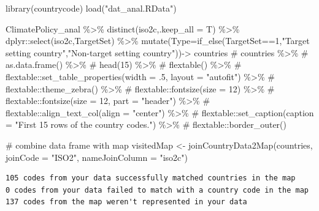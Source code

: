 \documentclass[
  letterpaper,
  DIV=11,
  numbers=noendperiod]{scrartcl}
\newenvironment{Shaded}{\begin{snugshade}}{\end{snugshade}}
\newcommand{\AttributeTok}[1]{\textcolor[rgb]{0.40,0.46,0.14}{#1}}
\newcommand{\CommentTok}[1]{\textcolor[rgb]{0.37,0.37,0.37}{#1}}
\newcommand{\DecValTok}[1]{\textcolor[rgb]{0.68,0.00,0.00}{#1}}
\newcommand{\FunctionTok}[1]{\textcolor[rgb]{0.28,0.35,0.67}{#1}}
\newcommand{\NormalTok}[1]{\textcolor[rgb]{0.00,0.46,0.62}{#1}}
\newcommand{\OtherTok}[1]{\textcolor[rgb]{0.00,0.46,0.62}{#1}}
\newcommand{\SpecialCharTok}[1]{\textcolor[rgb]{0.37,0.37,0.37}{#1}}
\newcommand{\StringTok}[1]{\textcolor[rgb]{0.13,0.47,0.30}{#1}}
\begin{document}
\begin{Shaded}
\begin{Highlighting}[]
\FunctionTok{library}\NormalTok{(countrycode)}
\FunctionTok{load}\NormalTok{(}\StringTok{"dat\_anal.RData"}\NormalTok{)}

\NormalTok{ClimatePolicy\_anal }\SpecialCharTok{\%\textgreater{}\%} 
  \FunctionTok{distinct}\NormalTok{(iso2c,}\AttributeTok{.keep\_all =}\NormalTok{ T) }\SpecialCharTok{\%\textgreater{}\%}
\NormalTok{  dplyr}\SpecialCharTok{::}\FunctionTok{select}\NormalTok{(iso2c,TargetSet) }\SpecialCharTok{\%\textgreater{}\%}
  \FunctionTok{mutate}\NormalTok{(}\AttributeTok{Type=}\FunctionTok{if\_else}\NormalTok{(TargetSet}\SpecialCharTok{==}\DecValTok{1}\NormalTok{,}\StringTok{"Target setting country"}\NormalTok{,}\StringTok{"Non{-}target setting country"}\NormalTok{))}\OtherTok{{-}\textgreater{}}\NormalTok{ countries}
\CommentTok{\# countries \%\textgreater{}\%}
\CommentTok{\#   as.data.frame() \%\textgreater{}\%}
\CommentTok{\#   head(15) \%\textgreater{}\%}
\CommentTok{\#   flextable() \%\textgreater{}\%}
\CommentTok{\#   flextable::set\_table\_properties(width = .5, layout = "autofit") \%\textgreater{}\%}
\CommentTok{\#   flextable::theme\_zebra() \%\textgreater{}\%}
\CommentTok{\#   flextable::fontsize(size = 12) \%\textgreater{}\%}
\CommentTok{\#   flextable::fontsize(size = 12, part = "header") \%\textgreater{}\%}
\CommentTok{\#   flextable::align\_text\_col(align = "center") \%\textgreater{}\%}
\CommentTok{\#   flextable::set\_caption(caption = "First 15 rows of the country codes.")  \%\textgreater{}\%}
\CommentTok{\#   flextable::border\_outer()}
\end{Highlighting}
\end{Shaded}

\begin{Shaded}
\begin{Highlighting}[]
\CommentTok{\# combine data frame with map}
\NormalTok{visitedMap }\OtherTok{\textless{}{-}} \FunctionTok{joinCountryData2Map}\NormalTok{(countries, }
                                  \AttributeTok{joinCode =} \StringTok{"ISO2"}\NormalTok{,}
                                  \AttributeTok{nameJoinColumn =} \StringTok{"iso2c"}\NormalTok{)}
\end{Highlighting}
\end{Shaded}

\begin{verbatim}
105 codes from your data successfully matched countries in the map
0 codes from your data failed to match with a country code in the map
137 codes from the map weren't represented in your data
\end{verbatim}
\end{document}
